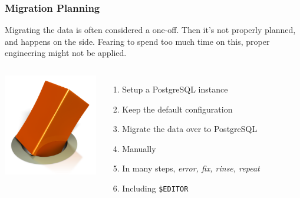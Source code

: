 \documentclass{beamer}
\begin{document}
\begin{frame}[fragile]
  \frametitle{Migration Planning}

  Migrating the data is often considered a one-off. Then it's not properly
  planned, and happens on the side. Fearing to spend too much time on this,
  proper engineering might not be applied.

  \vfill
  
  \begin{columns}[c]
    \begin{center}
      \includegraphics[height=12em]{round_hole_square_peg_6617.png}
    \end{center}

    \begin{enumerate}
    \item Setup a PostgreSQL instance
    \item Keep the default configuration
    \item Migrate the data over to PostgreSQL
    \item Manually
    \item In many steps, \textit{error, fix, rinse, repeat}
    \item Including \texttt{\$EDITOR}
    \end{enumerate}
  \end{columns}
\end{frame}
\end{document}
